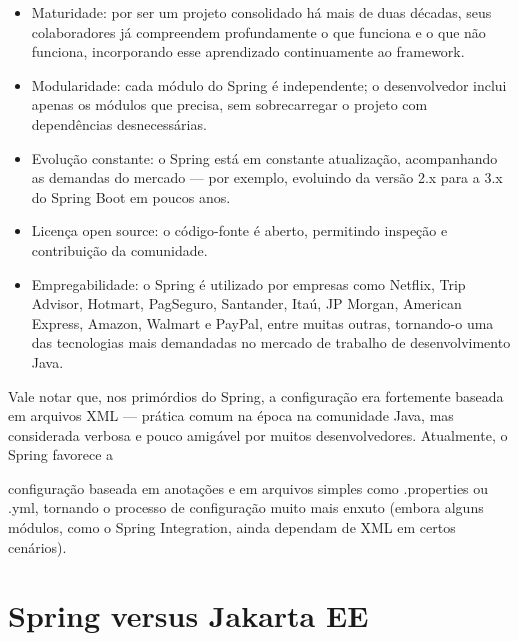 \begin{itemize}
  \item Maturidade: por ser um projeto consolidado há mais de duas décadas, seus colaboradores já compreendem profundamente o que funciona e o que não funciona, incorporando esse aprendizado continuamente ao framework.
\end{itemize}

\begin{itemize}
  \item Modularidade: cada módulo do Spring é independente; o desenvolvedor inclui apenas os módulos que precisa, sem sobrecarregar o projeto com dependências desnecessárias.
\end{itemize}

\begin{itemize}
  \item Evolução constante: o Spring está em constante atualização, acompanhando as demandas do mercado — por exemplo, evoluindo da versão 2.x para a 3.x do Spring Boot em poucos anos.
\end{itemize}

\begin{itemize}
  \item Licença open source: o código-fonte é aberto, permitindo inspeção e contribuição da comunidade.
\end{itemize}

\begin{itemize}
  \item Empregabilidade: o Spring é utilizado por empresas como Netflix, Trip Advisor, Hotmart, PagSeguro, Santander, Itaú, JP Morgan, American Express, Amazon, Walmart e PayPal, entre muitas outras, tornando-o uma das tecnologias mais demandadas no mercado de trabalho de desenvolvimento Java.
\end{itemize}

Vale notar que, nos primórdios do Spring, a configuração era fortemente baseada em arquivos XML — prática comum na época na comunidade Java, mas considerada verbosa e pouco amigável por muitos desenvolvedores. Atualmente, o Spring favorece a

configuração baseada em anotações e em arquivos simples como .properties ou .yml, tornando o processo de configuração muito mais enxuto (embora alguns módulos, como o Spring Integration, ainda dependam de XML em certos cenários).

\section{Spring versus Jakarta EE}

